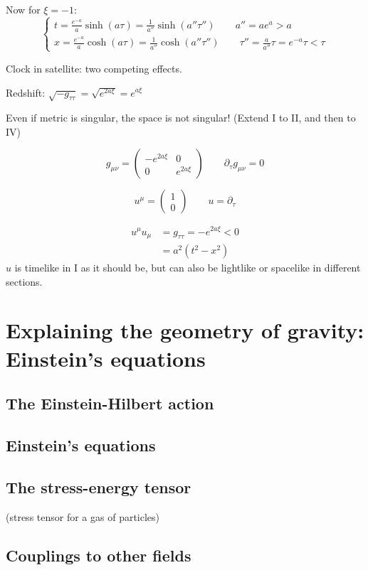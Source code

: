 Now for $\xi = -1$:
\[ \begin{cases}
t = \frac{e^{-a}}{a} \sinh(a\tau) = \frac{1}{a''} \sinh(a''\tau'') \qquad a''=ae^{a} > a\\
x = \frac{e^{-a}}{a} \cosh(a\tau) = \frac{1}{a''} \cosh(a''\tau'') \qquad \tau'' = \frac{a}{a''} \tau = e^{-a}\tau < \tau
\end{cases} \]

Clock in satellite: two competing effects.

Redshift: $\sqrt{-g_{\tau\tau}} = \sqrt{e^{2a\xi}} = e^{a\xi}$


Even if metric is singular, the space is not singular! (Extend I to II, and then to IV)

\[ g_{\mu\nu} = \begin{pmatrix}
-e^{2a\xi} & 0 \\
0& e^{2a\xi}
\end{pmatrix} \qquad \partial_{\tau}g_{\mu\nu} = 0 \]

\[u^{\mu} = \begin{pmatrix}
1\\ 0
\end{pmatrix} \qquad u = \partial_\tau\]

\begin{align*}
u^\mu u_\mu &= g_{\tau\tau} = -e^{2a\xi} < 0 \\
&= a^2(t^2-x^2)
\end{align*}
$u$ is timelike in I as it should be, but can also be lightlike or spacelike in different sections.





\chapter{Explaining the geometry of gravity: Einstein's equations}
\section{The Einstein-Hilbert action}
\section{Einstein's equations}
\section{The stress-energy tensor}
(stress tensor for a gas of particles)

\section{Couplings to other fields}

